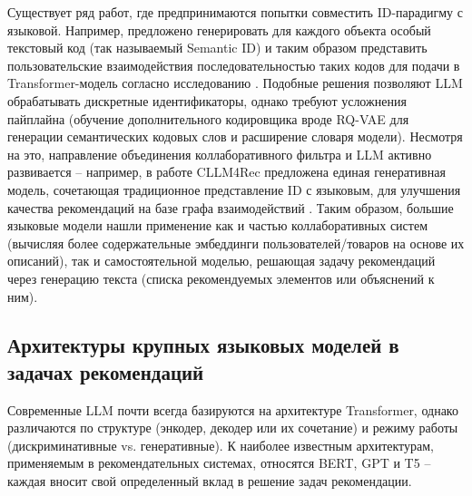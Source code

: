 Существует ряд работ, где предпринимаются попытки совместить ID-парадигму с языковой. Например, предложено генерировать для каждого объекта особый текстовый код (так называемый Semantic ID) и таким образом представить пользовательские взаимодействия последовательностью таких кодов для подачи в Transformer-модель согласно исследованию \citep{rajput2023recommendersystemsgenerativeretrieval}. Подобные решения позволяют LLM обрабатывать дискретные идентификаторы, однако требуют усложнения пайплайна (обучение дополнительного кодировщика вроде RQ-VAE для генерации семантических кодовых слов и расширение словаря модели). Несмотря на это, направление объединения коллаборативного фильтра и LLM активно развивается – например, в работе CLLM4Rec предложена единая генеративная модель, сочетающая традиционное представление ID с языковым, для улучшения качества рекомендаций на базе графа взаимодействий \citep{zhu2024collaborativelargelanguagemodel}. Таким образом, большие языковые модели нашли применение как и частью коллаборативных систем (вычисляя более содержательные эмбеддинги пользователей/товаров на основе их описаний), так и самостоятельной моделью, решающая задачу рекомендаций через генерацию текста (списка рекомендуемых элементов или объяснений к ним).

\subsection*{Архитектуры крупных языковых моделей в задачах рекомендаций}

Современные LLM почти всегда базируются на архитектуре Transformer, однако различаются по структуре (энкодер, декодер или их сочетание) и режиму работы (дискриминативные vs. генеративные). К наиболее известным архитектурам, применяемым в рекомендательных системах, относятся BERT, GPT и T5 – каждая вносит свой определенный вклад в решение задач рекомендации.

